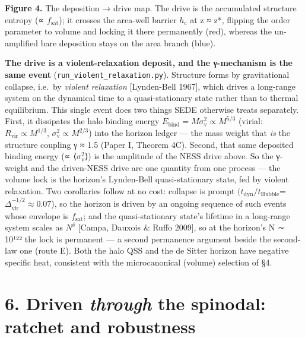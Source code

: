 \documentclass[
  10pt,
]{article}
\begin{document}
\textbf{Figure 4.} The deposition → drive map. The drive is the
accumulated structure entropy (∝ \(f_{\mathrm{sat}}\)); it crosses the
area-well barrier \(h_{\mathrm{c}}\) at z ≈ z*, flipping the order
parameter to volume and locking it there permanently (red), whereas the
un-amplified bare deposition stays on the area branch (blue).

\textbf{The drive is a violent-relaxation deposit, and the γ-mechanism
is the same event} (\texttt{run\_violent\_relaxation.py}). Structure
forms by gravitational collapse, i.e.~by \emph{violent relaxation}
{[}Lynden-Bell 1967{]}, which drives a long-range system on the
dynamical time to a quasi-stationary state rather than to thermal
equilibrium. This single event does two things SEDE otherwise treats
separately. First, it dissipates the halo binding energy
\(E_{\mathrm{bind}} = M\sigma _{\mathrm{v}}^{2} \propto  M^{5/3}\)
(virial: \(R_{\mathrm{vir}} \propto  M^{1/3}\),
\(\sigma _{\mathrm{v}}^{2} \propto  M^{2/3}\)) into the horizon ledger
--- the mass weight that \emph{is} the structure coupling γ ≈ 1.5 (Paper
I, Theorem 4C). Second, that same deposited binding energy (∝
⟨\(\sigma _{\mathrm{v}}^{2}\)⟩) is the amplitude of the NESS drive
above. So the γ-weight and the driven-NESS drive are one quantity from
one process --- the volume lock is the horizon's Lynden-Bell
quasi-stationary state, fed by violent relaxation. Two corollaries
follow at no cost: collapse is prompt
\((t_{\mathrm{dyn}}/t_{\mathrm{Hubble}}\)=
\(\Delta _{\mathrm{vir}}^{-1/2} \approx  0.07\)), so the horizon is
driven by an ongoing sequence of such events whose envelope is
\(f_{\mathrm{sat}}\); and the quasi-stationary state's lifetime in a
long-range system scales as \(N^{\delta }\) {[}Campa, Dauxois \& Ruffo
2009{]}, so at the horizon's N ∼ 10¹²² the lock is permanent --- a
second permanence argument beside the second-law one (route E). Both the
halo QSS and the de Sitter horizon have negative specific heat,
consistent with the microcanonical (volume) selection of §4.

\section{\texorpdfstring{6. Driven \emph{through} the spinodal: ratchet
and
robustness}{6. Driven through the spinodal: ratchet and robustness}}\label{driven-through-the-spinodal-ratchet-and-robustness}
\end{document}
